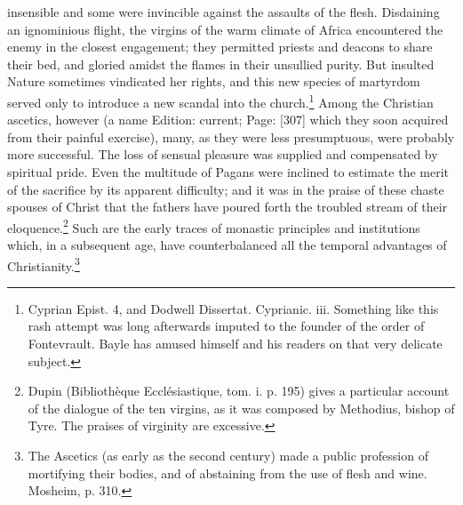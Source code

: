 insensible and some were invincible against the assaults of the flesh. Disdaining an ignominious flight, the virgins of the warm climate of Africa encountered the enemy in the closest engagement; they permitted priests and deacons to share their bed, and gloried amidst the flames in their unsullied purity. But insulted Nature sometimes vindicated her rights, and this new species of martyrdom served only to introduce a new scandal into the church.\footnote{Cyprian Epist. 4, and Dodwell Dissertat. Cyprianic. iii. Something like this rash attempt was long afterwards imputed to the founder of the order of Fontevrault. Bayle has amused himself and his readers on that very delicate subject.} Among the Christian ascetics, however (a name Edition: current; Page: [307] which they soon acquired from their painful exercise), many, as they were less presumptuous, were probably more successful. The loss of sensual pleasure was supplied and compensated by spiritual pride. Even the multitude of Pagans were inclined to estimate the merit of the sacrifice by its apparent difficulty; and it was in the praise of these chaste spouses of Christ that the fathers have poured forth the troubled stream of their eloquence.\footnote{Dupin (Bibliothèque Ecclésiastique, tom. i. p. 195) gives a particular account of the dialogue of the ten virgins, as it was composed by Methodius, bishop of Tyre. The praises of virginity are excessive.} Such are the early traces of monastic principles and institutions which, in a subsequent age, have counterbalanced all the temporal advantages of Christianity.\footnote{The Ascetics (as early as the second century) made a public profession of mortifying their bodies, and of abstaining from the use of flesh and wine. Mosheim, p. 310.}

